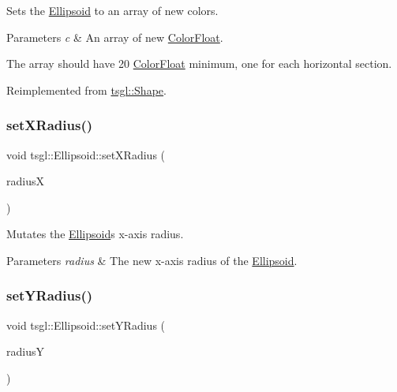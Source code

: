 Sets the \hyperlink{classtsgl_1_1_ellipsoid}{Ellipsoid} to an array of new colors. 


\begin{DoxyParams}{Parameters}
{\em c} & An array of new \hyperlink{structtsgl_1_1_color_float}{Color\+Float}.\\
\hline
\end{DoxyParams}
The array should have 20 \hyperlink{structtsgl_1_1_color_float}{Color\+Float} minimum, one for each horizontal section. 

Reimplemented from \hyperlink{classtsgl_1_1_shape_ad7e554b5d4cea111ec518548b9f21388}{tsgl\+::\+Shape}.

\mbox{\label{classtsgl_1_1_ellipsoid_a5ddfa2710dfff0e34186a9719f058fb7}} 
\subsubsection{\texorpdfstring{set\+X\+Radius()}{setXRadius()}}
{\footnotesize\ttfamily void tsgl\+::\+Ellipsoid\+::set\+X\+Radius (\begin{DoxyParamCaption}\item[{G\+Lfloat}]{radiusX }\end{DoxyParamCaption})\hspace{0.3cm}{\ttfamily [virtual]}}



Mutates the \hyperlink{classtsgl_1_1_ellipsoid}{Ellipsoid}\textquotesingle{}s x-\/axis radius. 


\begin{DoxyParams}{Parameters}
{\em radius} & The new x-\/axis radius of the \hyperlink{classtsgl_1_1_ellipsoid}{Ellipsoid}. \\
\hline
\end{DoxyParams}
\mbox{\label{classtsgl_1_1_ellipsoid_a6a47161df73d22188aae92016c3058ca}} 
\subsubsection{\texorpdfstring{set\+Y\+Radius()}{setYRadius()}}
{\footnotesize\ttfamily void tsgl\+::\+Ellipsoid\+::set\+Y\+Radius (\begin{DoxyParamCaption}\item[{G\+Lfloat}]{radiusY }\end{DoxyParamCaption})\hspace{0.3cm}{\ttfamily [virtual]}}




